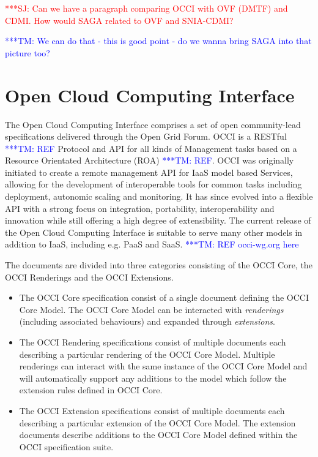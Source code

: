 \documentclass[10pt,conference,final,letterpaper,twoside,twocolumn,]{IEEEtran}
\newcommand{\jhanote}[1]{ {\textcolor{red}     {***SJ: #1}}}
\newcommand{\tmnote}[1]{  {\textcolor{blue}    {***TM: #1}}}
\newcommand{\jhanote}[1]{}
\newcommand{\tmnote}[1]{}
\begin{document}
\jhanote{Can we have a paragraph comparing OCCI with OVF (DMTF) and
  CDMI. How would SAGA related to OVF and SNIA-CDMI?}

\tmnote{We can do that - this is good point - do we wanna bring SAGA into that picture too?}

\section{Open Cloud Computing Interface}
The Open Cloud Computing Interface comprises a set of open
community-lead specifications delivered through the Open Grid
Forum. OCCI is a RESTful \tmnote{REF} Protocol and API for all kinds
of Management tasks based on a Resource Orientated Architecture (ROA)
\tmnote{REF}. OCCI was originally initiated to create a remote
management API for IaaS model based Services, allowing for the
development of interoperable tools for common tasks including
deployment, autonomic scaling and monitoring. It has since evolved
into a flexible API with a strong focus on integration, portability,
interoperability and innovation while still offering a high degree of
extensibility. The current release of the Open Cloud Computing
Interface is suitable to serve many other models in addition to IaaS,
including e.g. PaaS and SaaS. \tmnote{REF occi-wg.org here}

The documents are divided into three categories consisting of the OCCI
Core, the OCCI Renderings and the OCCI Extensions.
 
\begin{itemize}
  \item The OCCI Core specification consist of a single document
    defining the OCCI Core Model. The OCCI Core Model can be
    interacted with {\em renderings} (including associated behaviours)
    and expanded through {\em extensions}.
  \item The OCCI Rendering specifications consist of multiple
    documents each describing a particular rendering of the OCCI Core
    Model. Multiple renderings can interact with the same instance of
    the OCCI Core Model and will automatically support any additions
    to the model which follow the extension rules defined in OCCI
    Core.
  \item The OCCI Extension specifications consist of multiple
    documents each describing a particular extension of the OCCI Core
    Model. The extension documents describe additions to the OCCI Core
    Model defined within the OCCI specification suite.
\end{itemize}
\end{document}
